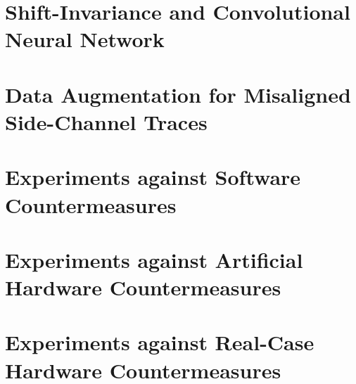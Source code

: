 
\section{Shift-Invariance and Convolutional Neural Network}


\section{Data Augmentation for Misaligned Side-Channel Traces}

\section{Experiments against Software Countermeasures}



\section{Experiments against Artificial Hardware Countermeasures}\label{sec:hardware}%


\section{Experiments against Real-Case Hardware Countermeasures}